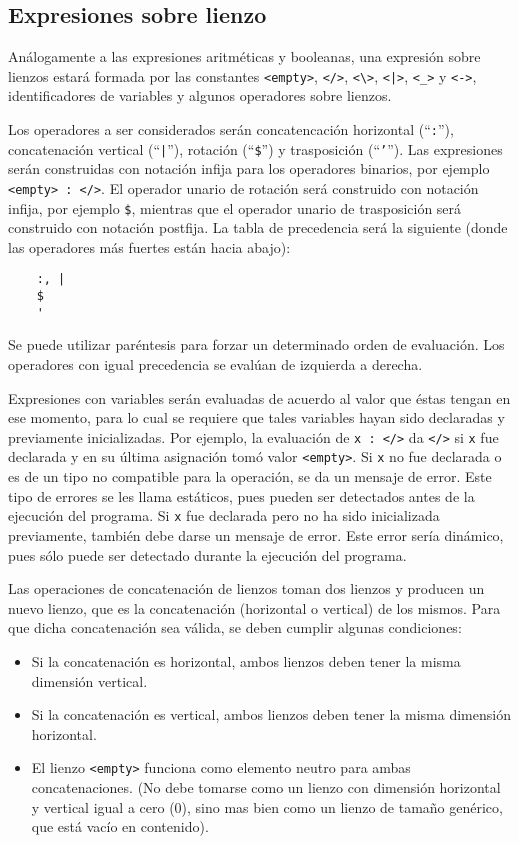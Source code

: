 \documentclass[letterpaper,11pt]{article}
\newcommand{\ttt}[1]{\texttt{#1}}
\newcommand{\qt}[1]{``\texttt{#1}''}
\begin{document}
\subsection{Expresiones sobre lienzo}

Análogamente a las expresiones aritméticas y booleanas, una expresión sobre lienzos estará formada por las constantes \texttt{<empty>}, \ttt{</>}, \ttt{<\textbackslash>}, \ttt{<|>}, \ttt{<\_>} y \ttt{<->}, identificadores de variables y algunos operadores sobre lienzos.

Los operadores a ser considerados serán concatencación horizontal (\qt{:}), concatenación vertical (\qt{|}), rotación (\qt{\$}) y trasposición (\qt{'}). Las expresiones serán construidas con notación infija para los operadores binarios, por ejemplo \ttt{<empty> : </>}. El operador unario de rotación será construido con notación infija, por ejemplo \ttt{\$<->}, mientras que el operador unario de trasposición será construido con notación postfija. La tabla de precedencia será la siguiente (donde las operadores más fuertes están hacia abajo):

\begin{lstlisting}
    :, |
    $
    '
\end{lstlisting}

Se puede utilizar paréntesis para forzar un determinado orden de evaluación. Los operadores con igual precedencia se evalúan de izquierda a derecha.

Expresiones con variables serán evaluadas de acuerdo al valor que éstas tengan en ese momento, para lo cual se requiere que tales variables hayan sido declaradas y previamente inicializadas. Por ejemplo, la evaluación de \texttt{x : </>} da \texttt{</>} si \ttt{x} fue declarada y en su última asignación tomó valor \texttt{<empty>}. Si \texttt{x} no fue declarada o es de un tipo no compatible para la operación, se da un mensaje de error. Este tipo de errores se les llama estáticos, pues pueden ser detectados antes de la ejecución del programa. Si \texttt{x} fue declarada pero no ha sido inicializada previamente, también debe darse un mensaje de error. Este error sería dinámico, pues sólo puede ser detectado durante la ejecución del programa.

Las operaciones de concatenación de lienzos toman dos lienzos y producen un nuevo lienzo, que es la concatenación (horizontal o vertical) de los mismos. Para que dicha concatenación sea válida, se deben cumplir algunas condiciones:

\begin{itemize}
    \item Si la concatenación es horizontal, ambos lienzos deben tener la misma dimensión vertical.
    \item Si la concatenación es vertical, ambos lienzos deben tener la misma dimensión horizontal.
    \item El lienzo \ttt{<empty>} funciona como elemento neutro para ambas concatenaciones. (No debe tomarse como un lienzo con dimensión horizontal y vertical igual a cero (0), sino mas bien como un lienzo de tamaño genérico, que está vacío en contenido).
\end{itemize}
\end{document}
